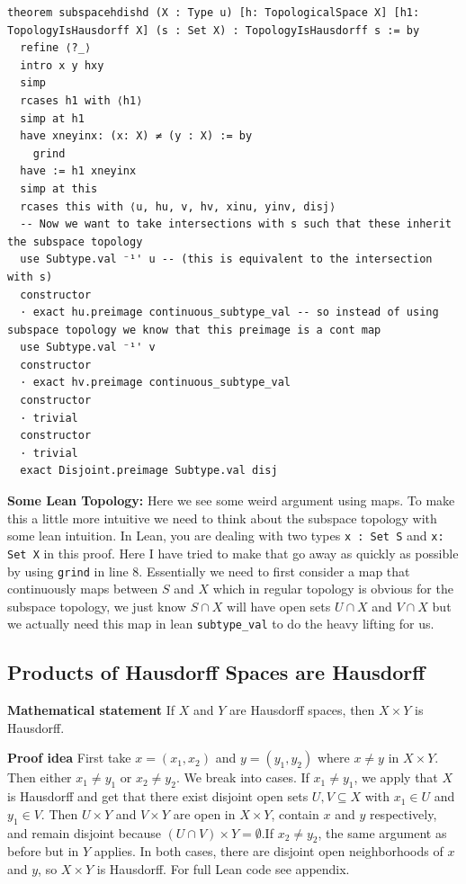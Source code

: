 \documentclass[11pt]{article}
\begin{document}
\begin{verbatim}
theorem subspacehdishd (X : Type u) [h: TopologicalSpace X] [h1: TopologyIsHausdorff X] (s : Set X) : TopologyIsHausdorff s := by
  refine ⟨?_⟩ 
  intro x y hxy
  simp 
  rcases h1 with ⟨h1⟩ 
  simp at h1
  have xneyinx: (x: X) ≠ (y : X) := by 
    grind
  have := h1 xneyinx 
  simp at this
  rcases this with ⟨u, hu, v, hv, xinu, yinv, disj⟩
  -- Now we want to take intersections with s such that these inherit the subspace topology
  use Subtype.val ⁻¹' u -- (this is equivalent to the intersection with s)
  constructor
  · exact hu.preimage continuous_subtype_val -- so instead of using subspace topology we know that this preimage is a cont map
  use Subtype.val ⁻¹' v 
  constructor
  · exact hv.preimage continuous_subtype_val 
  constructor
  · trivial
  constructor
  · trivial 
  exact Disjoint.preimage Subtype.val disj
\end{verbatim}


\medskip
\noindent
\textbf{Some Lean Topology:} Here we see some weird argument using maps. To make this a little more intuitive we need to think about the subspace topology with some lean intuition. In Lean, you are dealing with two types \verb|x : Set S| and \verb|x: Set X| in this proof. Here I have tried to make that go away as quickly as possible by using \verb|grind| in line 8. Essentially we need to first consider a map that continuously maps between $S$ and $X$ which in regular topology is obvious for the subspace topology, we just know $S \cap X$ will have open sets $U \cap X$ and $V \cap X$ but we actually need this map in lean \verb|subtype_val| to do the heavy lifting for us. 

\subsection{Products of Hausdorff Spaces are Hausdorff}

\textbf{Mathematical statement} 
If $X$ and $Y$ are Hausdorff spaces, then $X\times Y$ is Hausdorff.

\textbf{Proof idea} 
First take $x = (x_1,x_2)$ and $y = (y_1,y_2)$ where $x \not = y$ in $X \times Y$. Then either $x_1 \neq y_1$ or $x_2 \neq y_2$. We break into cases. If $x_1 \neq y_1$, we apply that $X$ is Hausdorff and get that there exist disjoint open sets $U,V \subseteq X$ with $x_1 \in U$ and $y_1 \in V$. Then $U \times Y$ and $V \times Y$ are open in $X \times Y$, contain $x$ and $y$ respectively, and remain disjoint because $(U \cap V) \times Y = \emptyset$.If $x_2 \neq y_2$, the same argument as before but in $Y$ applies. In both cases, there are disjoint open neighborhoods of $x$ and $y$, so $X \times Y$ is Hausdorff. For full Lean code see appendix.
\end{document}
